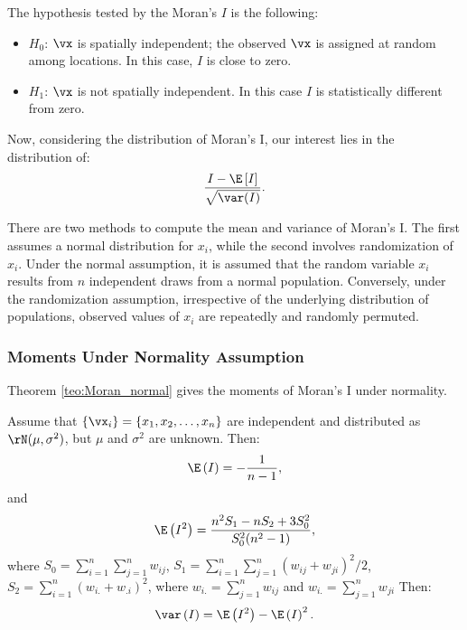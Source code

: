 \documentclass[english,12pt]{book}\usepackage[]{graphicx}\usepackage[]{xcolor}
\begin{document}
The hypothesis tested by the Moran's $I$ is the following:
\begin{itemize}
  \item $H_0$: $\vx$ is spatially independent; the observed $\vx$ is assigned at random among locations. In this case, $I$ is close to zero.
  \item $H_1$: $\vx$ is not spatially independent. In this case $I$ is statistically different from zero. 
\end{itemize}

Now, considering the distribution of Moran's I, our interest lies in the distribution of:
\begin{equation*}
  \frac{I - \E\left[I\right]}{\sqrt{\var(I)}}.
\end{equation*}

There are two methods to compute the mean and variance of Moran's I. The first assumes a normal distribution for $x_i$, while the second involves randomization of $x_i$. Under the normal assumption, it is assumed that the random variable $x_i$ results from $n$ independent draws from a normal population. Conversely, under the randomization assumption, irrespective of the underlying distribution of populations, observed values of $x_i$ are repeatedly and randomly permuted.

\subsubsection{Moments Under Normality Assumption}

Theorem \ref{teo:Moran_normal} gives the moments of Moran's I under normality. 

\begin{theorem}\label{teo:Moran_normal}
Assume that $\left\lbrace \vx_i\right\rbrace = \left\lbrace x_1, x_2,\ldots, x_n\right\rbrace$ are independent and distributed as $\rN(\mu, \sigma^2)$, but $\mu$ and $\sigma^2$ are unknown. Then:
\begin{equation*}
\E\left(I\right) = - \frac{1}{n - 1}, 
\end{equation*}
%
and
\begin{equation*}
\E\left(I^2\right) = \frac{n^2S_1 - nS_2 + 3S_0^2}{S_0^2(n^2 - 1)},
\end{equation*}
%
where $S_0=\sum_{i = 1}^n\sum_{j=1}^nw_{ij}$, $S_1= \sum_{i = 1}^n\sum_{j = 1}^n(w_{ij} + w_{ji})^2/2$, $S_2 = \sum_{i = 1}^n(w_{i.} + w_{.i})^2$, where $w_{i.}= \sum_{j = 1}^nw_{ij}$ and $w_{i.}=\sum_{j = 1}^nw_{ji}$
Then:
\begin{equation*}
\var\left(I\right)=\E\left(I^2\right) - \E\left(I\right)^2.
\end{equation*}
\end{theorem}
\end{document}

